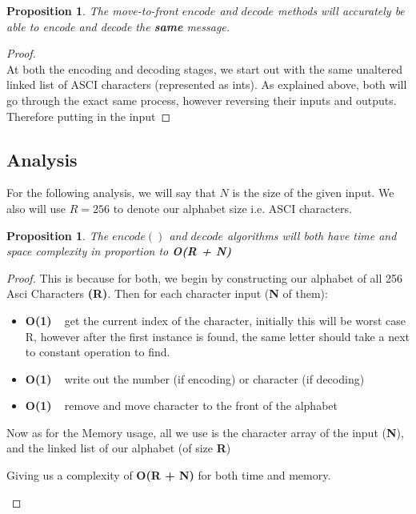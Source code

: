 \documentclass[12pt]{article}
\newtheorem{proposition}[theorem]{Proposition}
\begin{document}
\begin{proposition}
The move-to-front $encode$ and $decode$ methods will accurately be able to encode
and decode the \textbf{same} message.
\end{proposition}

\begin{proof}
~ \\ \indent At both the encoding and decoding stages, we start out with the same unaltered linked
list of ASCI characters (represented as ints). As explained above, both will go through the exact
same process, however reversing their inputs and outputs. Therefore putting in the input
\end{proof}

\subsection{Analysis}
For the following analysis, we will say that $N$ is the size of the given input.
We also will use $R = 256$ to denote our alphabet size i.e. ASCI characters.

\begin{proposition}
\label{numq}
The $encode()$ and $decode$ algorithms will both have time and space complexity in
proportion to \textbf{O(R + N)}

\end{proposition}
\begin{proof}
This is because for both, we begin by constructing our alphabet of all 256 Asci Characters \textbf{(R)}.
Then for each character input (\textbf{N} of them):
\begin{itemize}
    \item \textbf{O(1)} ~ get the current index of the character, initially this will be worst
                        case R, however after the first instance is found, the same letter
                        should take a next to constant operation to find.
    \item \textbf{O(1)} ~ write out the number (if encoding) or character (if decoding)
    \item \textbf{O(1)} ~ remove and move character to the front of the alphabet
\end{itemize}
Now as for the Memory usage, all we use is the character array of the input (\textbf{N}),
and the linked list of our alphabet (of size \textbf{R})
\begin{center}
    Giving us a complexity of \textbf{O(R + N)} for both time and memory.
\end{center}
\end{proof}
\end{document}
